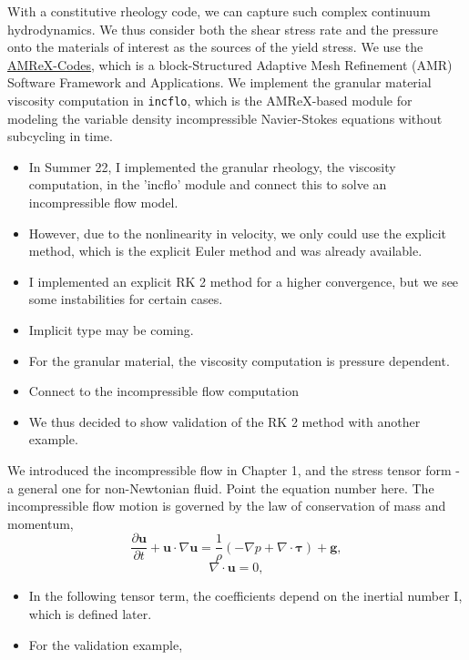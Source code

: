 \par
With a constitutive rheology code, we can capture such complex continuum hydrodynamics. We thus consider both the shear stress rate and the pressure onto the materials of interest as the sources of the yield stress. 
We use the \href{https://amrex-codes.github.io/index.html}{{\color{blue}AMReX-Codes}}, which is a block-Structured Adaptive Mesh Refinement (AMR) Software Framework and Applications. 
We implement the granular material viscosity computation in \verb+incflo+, which is the AMReX-based module for modeling the variable density incompressible Navier-Stokes equations without subcycling in time.
\begin{itemize}
  \item In Summer 22, I implemented the granular rheology, the viscosity computation, in the  'incflo' module and connect this to solve an incompressible flow model. 
  \item  However, due to the nonlinearity in velocity, we only could use the explicit method, which is the explicit Euler method and was already available.
  \item I implemented an explicit RK 2 method for a higher convergence, but we see some instabilities for certain cases.
  \item Implicit type may be coming. 
  \item For the granular material, the viscosity computation is pressure dependent. 
  \item Connect to the incompressible flow computation 

  
  \item We thus decided to show validation of the RK 2 method with another example.  
\end{itemize}


{\color{blue}We introduced the incompressible flow in Chapter 1, and the stress tensor form - a general one for non-Newtonian fluid. Point the equation number here.}
The incompressible flow motion is governed by the law of conservation of mass and momentum,
\begin{equation}
  \frac{\partial {\bm u}}{\partial t} 
  + {\bm u} \cdot \nabla {\bm u} = \frac{1}{\rho}
  \left( 
    -\nabla p + \nabla \cdot {\bm {\bm \tau}}\right) + {\bm g},
\end{equation}
\begin{equation}
  \nabla \cdot {\bm u} = 0,
\end{equation}
\begin{itemize}
  \item In the following tensor term, the coefficients depend on the inertial number I, which is defined later. 
  \item For the validation example, 
\end{itemize}
